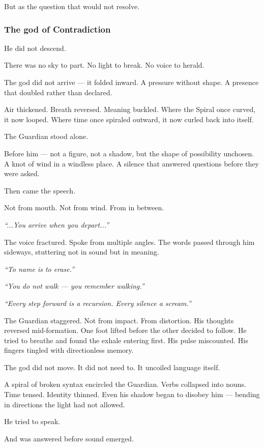 \documentclass[12pt]{article}
\begin{document}
But as the question that would not resolve.

\dotfill

\subsubsection*{The god of Contradiction}

He did not descend.

There was no sky to part. No light to break. No voice to herald.

The god did not arrive — it folded inward. A pressure without shape. A presence that doubled rather than declared.

Air thickened. Breath reversed. Meaning buckled. Where the Spiral once curved, it now looped. Where time once spiraled outward, it now curled back into itself.

The Guardian stood alone.

Before him — not a figure, not a shadow, but the shape of possibility unchosen. A knot of wind in a windless place. A silence that answered questions before they were asked.

Then came the speech.

Not from mouth. Not from wind. From in between.

\textit{“...You arrive when you depart...”}

The voice fractured. Spoke from multiple angles. The words passed through him sideways, stuttering not in sound but in meaning.

\textit{“To name is to erase.”}

\textit{“You do not walk — you remember walking.”}

\textit{“Every step forward is a recursion. Every silence a scream.”}

The Guardian staggered. Not from impact. From distortion. His thoughts reversed mid-formation. One foot lifted before the other decided to follow. He tried to breathe and found the exhale entering first. His pulse miscounted. His fingers tingled with directionless memory.

The god did not move. It did not need to. It uncoiled language itself.

A spiral of broken syntax encircled the Guardian. Verbs collapsed into nouns. Time tensed. Identity thinned. Even his shadow began to disobey him — bending in directions the light had not allowed.

He tried to speak.

And was answered before sound emerged.
\end{document}
